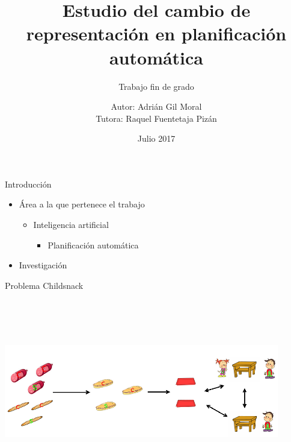 \documentclass[xcolor=table]{beamer}
\title[Estudio del cambio de representación en PA]
{Estudio del cambio de representación en planificación automática}
\subtitle{Trabajo fin de grado}
\author[Adrián Gil Moral] %
{Autor: Adrián Gil Moral \\ Tutora: Raquel Fuentetaja Pizán}
\institute[UC3M]
{
  Departamento de informática \\
  Universidad Carlos III de Madrid
}
\date[Julio 2017] %
{Julio 2017}
\begin{document}

\frame{\titlepage}

\begin{frame}{Introducción}
    
    \begin{itemize}
        \item Área a la que pertenece el trabajo
        \begin{itemize}
            \item Inteligencia artificial
            \begin{itemize}
                \item Planificación automática
            \end{itemize}
        \end{itemize}
        \item Investigación
        
    \end{itemize}
\end{frame}


\begin{frame}{Problema Childsnack}

    \includegraphics[width=12cm,height=8cm]{childSnack}
\end{frame}

\end{document}
